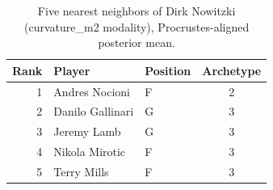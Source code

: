 \begin{table}[htbp]
  \centering\small
  \begin{tabular}{rllc}
    \toprule
    Rank & Player & Position & Archetype \\
    \midrule
    1 & Andres Nocioni & F & 2 \\
    2 & Danilo Gallinari & G & 3 \\
    3 & Jeremy Lamb & G & 3 \\
    4 & Nikola Mirotic & F & 3 \\
    5 & Terry Mills & F & 3 \\
    \bottomrule
  \end{tabular}
  \caption{Five nearest neighbors of Dirk Nowitzki (curvature_m2 modality), Procrustes-aligned posterior mean.}
  \label{tab:Dirk_Nowitzki_neighbors_curvature_m2}
\end{table}


